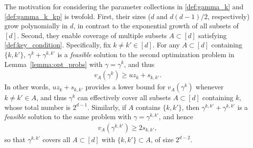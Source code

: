 \documentclass[aap,preprint]{imsart}
\theoremstyle{plain}
\theoremstyle{definition}
\begin{document}
The motivation for considering the parameter collections in \eqref{def:gamma_k} and \eqref{def:gamma_k_kp} is twofold. First, their sizes ($d$ and $d(d-1)/2$, respectively) grow polynomially in $d$, in contrast to the exponential growth of all subsets of $[d]$. Second, they enable coverage of multiple subsets $A \subset [d]$ satisfying \eqref{def:key_condition}. Specifically, fix $k \neq k' \in [d]$. For any $A \subset [d]$ containing $\{k, k'\}$,  $\gamma^k + \gamma^{k,k'}$ is a \textit{feasible} solution to the second optimization problem in Lemma~\ref{lemma:opt_probs} with $\gamma = \gamma^k$, and thus
\begin{align}
    \label{aux:inter_gamma_k_lower}
v_A(\gamma^k) \geq u z_k + s_{k,k'}.
\end{align}
In other words, $u z_k + s_{k,k'}$ provides a lower bound for $v_A(\gamma^k)$ whenever $k \neq k' \in A$, and thus $\gamma^k$ can effectively cover all subsets $A \subset [d]$ containing $k$, whose total number is $2^{d-1}$. Similarly, if $A$ contains $\{k, k'\}$, then $\gamma^{k,k'} + \gamma^{k,k'}$ is a \textit{feasible} solution to the same problem with $\gamma = \gamma^{k,k'}$, and hence
\begin{align}
    \label{aux:inter_gamma_k_kp_lower}
v_A(\gamma^{k,k'}) \geq 2 s_{k,k'},
\end{align}
so that $\gamma^{k,k'}$ covers all $A \subset [d]$ with $\{k, k'\} \subset A$, of size $2^{d-2}$. %





 
\end{document}
